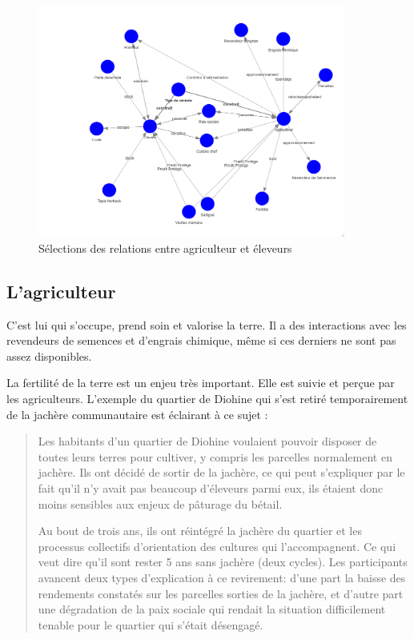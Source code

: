 \begin{figure}
  \begin{center}
    \includegraphics[width=0.9\textwidth]{img/agriculteur_eleveur.png}
  \end{center}
  \caption{Sélections des relations entre agriculteur et éleveurs}
  \label{fig:agripasteur}
\end{figure}

\subsection{L'agriculteur}
C'est lui qui s'occupe, prend soin et valorise la terre. Il a des interactions avec les revendeurs de semences et d'engrais chimique, même si ces derniers ne sont pas assez disponibles.

La fertilité de la terre est un enjeu très important. Elle est suivie et perçue par les agriculteurs. L'exemple du quartier de Diohine qui s'est retiré temporairement de la jachère communautaire est éclairant à ce sujet :
\begin{quote}
  Les habitants d'un quartier de Diohine voulaient pouvoir disposer de toutes leurs terres pour cultiver, y compris les parcelles normalement en jachère. Ils ont décidé de sortir de la jachère, ce qui peut s'expliquer par le fait qu'il n'y avait pas beaucoup d'éleveurs parmi eux, ils étaient donc moins sensibles aux enjeux de pâturage du bétail.

  Au bout de trois ans, ils ont réintégré la jachère du quartier et les processus collectifs d'orientation des cultures qui l'accompagnent. Ce qui veut dire qu'il sont rester 5 ans sans jachère (deux cycles). Les participants avancent deux types d'explication à ce revirement: d'une part la baisse des rendements constatés sur les parcelles sorties de la jachère, et d'autre part une dégradation de la paix sociale qui rendait la situation difficilement tenable pour le quartier qui s'était désengagé.
\end{quote}

